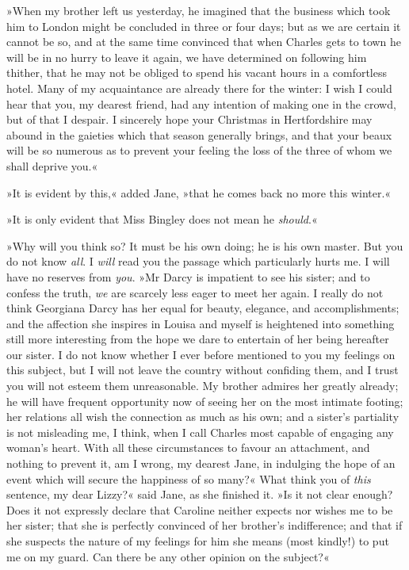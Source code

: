 »When my brother left us yesterday, he imagined that the business which took him to London might be concluded in three or four days; but as we are certain it cannot be so, and at the same time convinced that when Charles gets to town he will be in no hurry to leave it again, we have determined on following him thither, that he may not be obliged to spend his vacant hours in a comfortless hotel. Many of my acquaintance are already there for the winter: I wish I could hear that you, my dearest friend, had any intention of making one in the crowd, but of that I despair. I sincerely hope your Christmas in Hertfordshire may abound in the gaieties which that season generally brings, and that your beaux will be so numerous as to prevent your feeling the loss of the three of whom we shall deprive you.«

»It is evident by this,« added Jane, »that he comes back no more this winter.«

»It is only evident that Miss Bingley does not mean he \textit{should}.«

»Why will you think so? It must be his own doing; he is his own master. But you do not know \textit{all}. I \textit{will} read you the passage which particularly hurts me. I will have no reserves from \textit{you}. »Mr Darcy is impatient to see his sister; and to confess the truth, \textit{we} are scarcely less eager to meet her again. I really do not think Georgiana Darcy has her equal for beauty, elegance, and accomplishments; and the affection she inspires in Louisa and myself is heightened into something still more interesting from the hope we dare to entertain of her being hereafter our sister. I do not know whether I ever before mentioned to you my feelings on this subject, but I will not leave the country without confiding them, and I trust you will not esteem them unreasonable. My brother admires her greatly already; he will have frequent opportunity now of seeing her on the most intimate footing; her relations all wish the connection as much as his own; and a sister's partiality is not misleading me, I think, when I call Charles most capable of engaging any woman's heart. With all these circumstances to favour an attachment, and nothing to prevent it, am I wrong, my dearest Jane, in indulging the hope of an event which will secure the happiness of so many?« What think you of \textit{this} sentence, my dear Lizzy?« said Jane, as she finished it. »Is it not clear enough? Does it not expressly declare that Caroline neither expects nor wishes me to be her sister; that she is perfectly convinced of her brother's indifference; and that if she suspects the nature of my feelings for him she means (most kindly!) to put me on my guard. Can there be any other opinion on the subject?«

